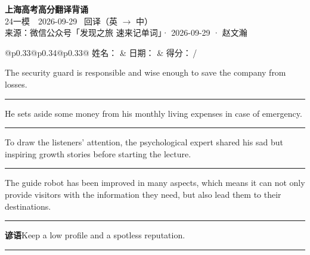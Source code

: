 \documentclass[11pt,a4paper]{article}
\newcommand{\num}[1]{\makebox[1.9em][r]{#1.}\hspace{0.3em}}
\newcommand{\wline}{\noindent\rule{\linewidth}{0.4pt}}
\begin{document}
\pagestyle{plain}
\begin{center}
{\LARGE\bfseries 上海高考高分翻译背诵 }\\[0.25em]
{\large 24一模　2026-09-29 \quad\ 回译（英 $\to$ 中）}\\[0.35em]
{\footnotesize 来源：微信公众号「发现之旅 速来记单词」· 2026-09-29 · 赵文瀚}
\end{center}

\vspace{0.4em}
\noindent\begin{tabular}{@{}p{0.33\textwidth}@{}p{0.34\textwidth}@{}p{0.33\textwidth}@{}}
姓名：\underline{\hspace{2.0cm}} & 日期：\underline{\hspace{2.0cm}} & 得分：\underline{\hspace{1.4cm}}\,/ \\
\end{tabular}

\vspace{0.5em}

\vspace{0.8em}
\num{1}The security guard is responsible and wise enough to save the company from losses.

\vspace{0.25em}

\wline

\num{2}He sets  aside some money from his monthly living expenses in case of emergency.

\vspace{0.25em}

\wline

\num{3}To draw the listeners’ attention, the psychological expert shared his sad but inspiring growth stories before starting the lecture.

\vspace{0.25em}

\wline

\num{4}The guide robot has been improved in many aspects, which means it can not only provide visitors with the information they need, but also lead them to their destinations.

\vspace{0.25em}

\wline

\vspace{0.4em}\noindent{\color{rulegray}\rule{\textwidth}{0.6pt}}\vspace{0.4em}

\num{5}\textbf{谚语}\quad Keep a low profile and a spotless reputation.

\vspace{0.25em}

\wline
\end{document}
